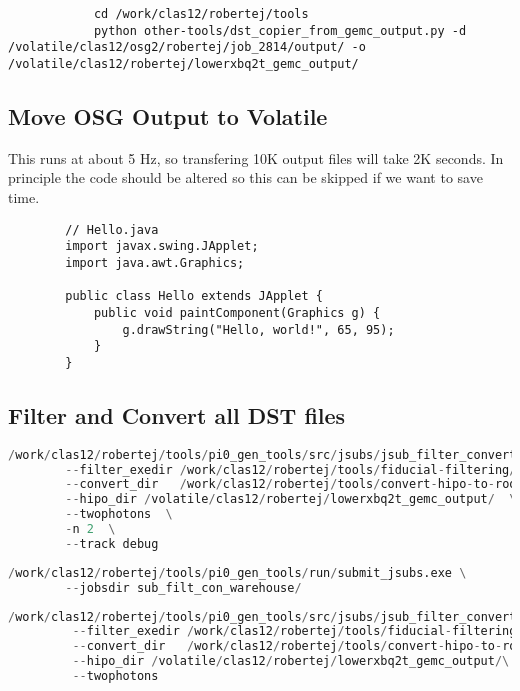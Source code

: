         \begin{lstlisting}
            cd /work/clas12/robertej/tools
            python other-tools/dst_copier_from_gemc_output.py -d /volatile/clas12/osg2/robertej/job_2814/output/ -o /volatile/clas12/robertej/lowerxbq2t_gemc_output/   
        \end{lstlisting}
        
    
    \subsection{Move OSG Output to Volatile}
        This runs at about 5 Hz, so transfering 10K output files will take 2K seconds. In principle the code should be altered so this can be skipped if we want to save time.

            \begin{lstlisting}
        // Hello.java
        import javax.swing.JApplet;
        import java.awt.Graphics;
        
        public class Hello extends JApplet {
            public void paintComponent(Graphics g) {
                g.drawString("Hello, world!", 65, 95);
            }    
        }
        \end{lstlisting}

\clearpage
    \subsection{Filter and Convert all DST files}

        \begin{lstlisting}[language=python,caption={Generate Test Submission Scripts}]
        /work/clas12/robertej/tools/pi0_gen_tools/src/jsubs/jsub_filter_convert_machine.py\
        --filter_exedir /work/clas12/robertej/tools/fiducial-filtering/filterEvents/\
        --convert_dir   /work/clas12/robertej/tools/convert-hipo-to-root/convertingHipo/minimal/\
        --hipo_dir /volatile/clas12/robertej/lowerxbq2t_gemc_output/  \
        --twophotons  \
        -n 2  \
        --track debug
        \end{lstlisting}
        
        \begin{lstlisting}[language=python,caption={Submit Test Submission Scripts}]
        /work/clas12/robertej/tools/pi0_gen_tools/run/submit_jsubs.exe \
        --jobsdir sub_filt_con_warehouse/
        \end{lstlisting}
        
        \begin{lstlisting}[language=python,caption={Generate All Submission Scripts}]
        /work/clas12/robertej/tools/pi0_gen_tools/src/jsubs/jsub_filter_convert_machine.py\ 
         --filter_exedir /work/clas12/robertej/tools/fiducial-filtering/filterEvents/\
         --convert_dir   /work/clas12/robertej/tools/convert-hipo-to-root/convertingHipo/minimal/\
         --hipo_dir /volatile/clas12/robertej/lowerxbq2t_gemc_output/\
         --twophotons  
        \end{lstlisting}
        
